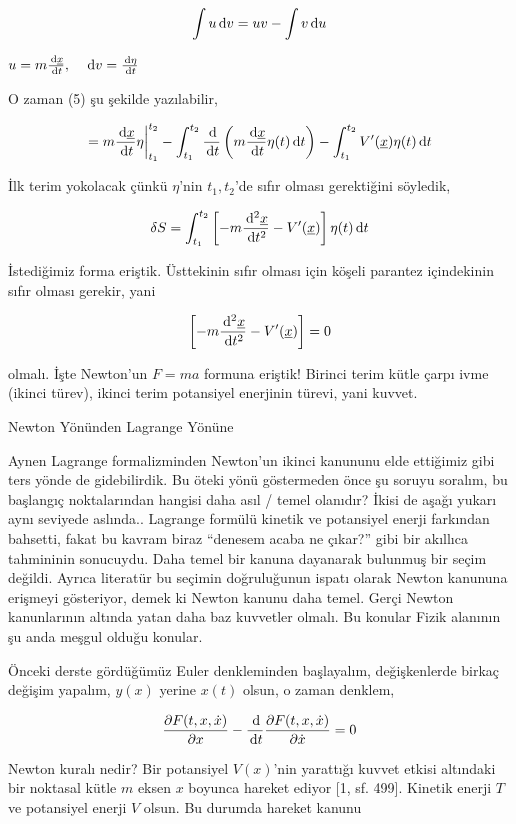 \documentclass[12pt,fleqn]{article}\usepackage{../../common}
\begin{document}
$$ 
\int u \,\mathrm{d} v = uv - \int v \,\mathrm{d} u
$$

$u = m \frac{\,\mathrm{d}\underline{x}}{\,\mathrm{d} t}, \quad \,\mathrm{d} v = \frac{\,\mathrm{d} \eta}{\,\mathrm{d} t}$

O zaman (5) şu şekilde yazılabilir,

$$ 
= m \frac{\,\mathrm{d} \underline{x}}{\,\mathrm{d} t} \eta \bigg\vert_{t_1}^{t_2} 
- \int_{t_1}^{t_2} \frac{\,\mathrm{d}}{\,\mathrm{d} t} \left( m \frac{\,\mathrm{d} \underline{x}}{\,\mathrm{d} t} \eta(t) \,\mathrm{d} t\right)
- \int_{t_1}^{t_2} V'(\underline{x}) \eta(t) \,\mathrm{d} t
$$

İlk terim yokolacak çünkü $\eta$'nin $t_1,t_2$'de sıfır olması gerektiğini söyledik,

$$ 
\delta S = 
\int_{t_1}^{t_2} \left[ 
-m \frac{\,\mathrm{d}^2 \underline{x}}{\,\mathrm{d} t^2} - V'(\underline{x})
\right] 
\eta(t) \,\mathrm{d} t
$$

İstediğimiz forma eriştik. Üsttekinin sıfır olması için köşeli parantez
içindekinin sıfır olması gerekir, yani

$$ 
\left[ 
-m \frac{\,\mathrm{d}^2 \underline{x}}{\,\mathrm{d} t^2} - V'(\underline{x})
\right]  = 0
$$

olmalı. İşte Newton'un $F = ma$ formuna eriştik! Birinci terim kütle çarpı
ivme (ikinci türev), ikinci terim potansiyel enerjinin türevi, yani kuvvet.

Newton Yönünden Lagrange Yönüne

Aynen Lagrange formalizminden Newton'un ikinci kanununu elde ettiğimiz gibi ters
yönde de gidebilirdik. Bu öteki yönü göstermeden önce şu soruyu soralım, bu
başlangıç noktalarından hangisi daha asıl / temel olanıdır? İkisi de aşağı
yukarı aynı seviyede aslında.. Lagrange formülü kinetik ve potansiyel enerji
farkından bahsetti, fakat bu kavram biraz ``denesem acaba ne çıkar?'' gibi bir
akıllıca tahmininin sonucuydu. Daha temel bir kanuna dayanarak bulunmuş bir
seçim değildi. Ayrıca literatür bu seçimin doğruluğunun ispatı olarak Newton
kanununa erişmeyi gösteriyor, demek ki Newton kanunu daha temel. Gerçi Newton
kanunlarının altında yatan daha baz kuvvetler olmalı. Bu konular Fizik alanının
şu anda meşgul olduğu konular.

Önceki derste gördüğümüz Euler denkleminden başlayalım, değişkenlerde birkaç
değişim yapalım, $y(x)$ yerine $x(t)$ olsun, o zaman denklem,

$$
\frac{\partial F(t,x,\dot{x})}{\partial x} - 
\frac{\,\mathrm{d} }{\,\mathrm{d} t} \frac{\partial F(t,x,\dot{x})}{\partial \dot{x}} = 0
$$

Newton kuralı nedir? Bir potansiyel $V(x)$'nin yarattığı kuvvet etkisi altındaki
bir noktasal kütle $m$ eksen $x$ boyunca hareket ediyor [1, sf. 499]. Kinetik
enerji $T$ ve potansiyel enerji $V$ olsun. Bu durumda hareket kanunu
\end{document}
